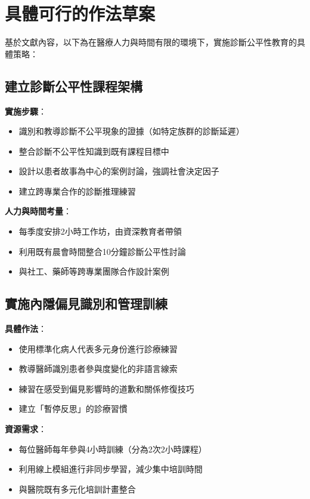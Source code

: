 \documentclass[12pt,a4paper]{article}
\begin{document}
\section{具體可行的作法草案}

基於文獻內容，以下為在醫療人力與時間有限的環境下，實施診斷公平性教育的具體策略：

\subsection{建立診斷公平性課程架構}
\textbf{實施步驟}：
\begin{itemize}[nosep]
    \item 識別和教導診斷不公平現象的證據（如特定族群的診斷延遲）
    \item 整合診斷不公平性知識到既有課程目標中
    \item 設計以患者故事為中心的案例討論，強調社會決定因子
    \item 建立跨專業合作的診斷推理練習
\end{itemize}

\textbf{人力與時間考量}：
\begin{itemize}[nosep]
    \item 每季度安排2小時工作坊，由資深教育者帶領
    \item 利用既有晨會時間整合10分鐘診斷公平性討論
    \item 與社工、藥師等跨專業團隊合作設計案例
\end{itemize}

\subsection{實施內隱偏見識別和管理訓練}
\textbf{具體作法}：
\begin{itemize}[nosep]
    \item 使用標準化病人代表多元身份進行診療練習
    \item 教導醫師識別患者參與度變化的非語言線索
    \item 練習在感受到偏見影響時的道歉和關係修復技巧
    \item 建立「暫停反思」的診療習慣
\end{itemize}

\textbf{資源需求}：
\begin{itemize}[nosep]
    \item 每位醫師每年參與4小時訓練（分為2次2小時課程）
    \item 利用線上模組進行非同步學習，減少集中培訓時間
    \item 與醫院既有多元化培訓計畫整合
\end{itemize}
\end{document}

